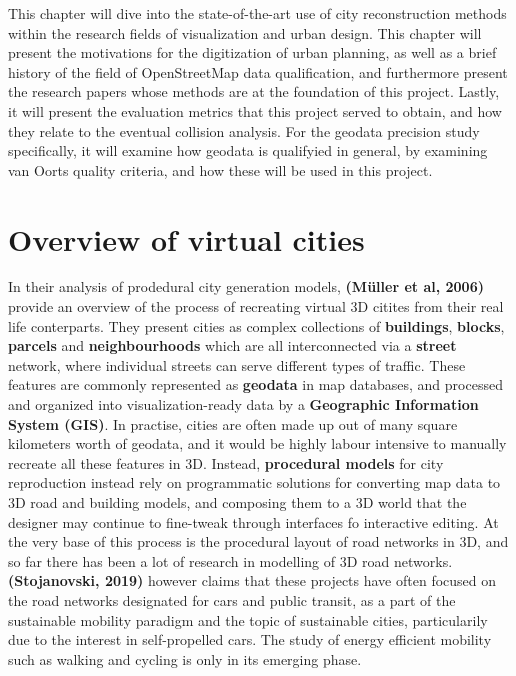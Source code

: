 \documentclass{kththesis}
\begin{document}
This chapter will dive into the state-of-the-art use of city reconstruction methods within the research fields of visualization and urban design.
This chapter will present the motivations for the digitization of urban planning, as well as a brief history of the field of OpenStreetMap data qualification, and furthermore present the research papers whose methods are at the foundation of this project.
Lastly, it will present the evaluation metrics that this project served to obtain, and how they relate to the eventual collision analysis.
For the geodata precision study specifically, it will examine how geodata is qualifyied in general, by examining van Oorts quality criteria, and how these will be used in this project.

\section{Overview of virtual cities}

In their analysis of prodedural city generation models, \textbf{(Müller et al, 2006)} provide an overview of the process of recreating virtual 3D citites from their real life conterparts.
They present cities as complex collections of \textbf{buildings}, \textbf{blocks}, \textbf{parcels} and \textbf{neighbourhoods} which are all interconnected via a \textbf{street} network, where individual streets can serve different types of traffic.
These features are commonly represented as \textbf{geodata} in map databases, and processed and organized into visualization-ready data by a \textbf{Geographic Information System (GIS)}.
In practise, cities are often made up out of many square kilometers worth of geodata, and it would be highly labour intensive to manually recreate all these features in 3D.
Instead, \textbf{procedural models} for city reproduction instead rely on programmatic solutions for converting map data to 3D road and building models, and composing them to a 3D world that the designer may continue to fine-tweak through interfaces fo interactive editing.
At the very base of this process is the procedural layout of road networks in 3D, and so far there has been a lot of research in modelling of 3D road networks.
\textbf{(Stojanovski, 2019)} however claims that these projects have often focused on the road networks designated for cars and public transit, as a part of the sustainable mobility paradigm and the topic of sustainable cities, particularily due to the interest in self-propelled cars.
The study of energy efficient mobility such as walking and cycling is only in its emerging phase.
\end{document}
